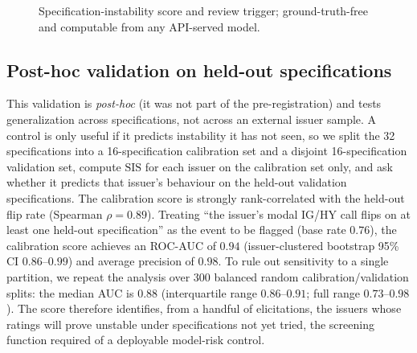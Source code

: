 \documentclass[a4paper,fleqn]{cas-sc}
\begin{document}
\begin{figure}[t]\centering
{}
\caption{Specification-instability score and review trigger; ground-truth-free and computable from any
API-served model.}\label{alg:sis}
\end{figure}

\subsection{Post-hoc validation on held-out specifications}\label{sec:sis-val}
This validation is \emph{post-hoc} (it was not part of the pre-registration) and tests generalization
across specifications, not across an external issuer sample. A control is only useful if it predicts
instability it has not seen, so we split the 32 specifications into a 16-specification calibration set and
a disjoint 16-specification validation set, compute $\mathrm{SIS}$ for each issuer on the calibration set
only, and ask whether it predicts that issuer's behaviour on the held-out validation specifications. The
calibration score is strongly rank-correlated with the held-out flip rate (Spearman $\rho=0.89$). Treating
``the issuer's modal IG/HY call flips on at least one held-out specification'' as the event to be flagged
(base rate $0.76$), the calibration score achieves an ROC-AUC of $0.94$ (issuer-clustered bootstrap 95\%
CI $0.86$--$0.99$) and average precision of $0.98$. To rule out sensitivity to a single partition, we
repeat the analysis over 300 balanced random calibration/validation splits: the median AUC is $0.88$
(interquartile range $0.86$--$0.91$; full range $0.73$--$0.98$). The score therefore identifies, from a
handful of elicitations, the issuers whose ratings will prove unstable under specifications not yet
tried, the screening function required of a deployable model-risk control.
\end{document}
